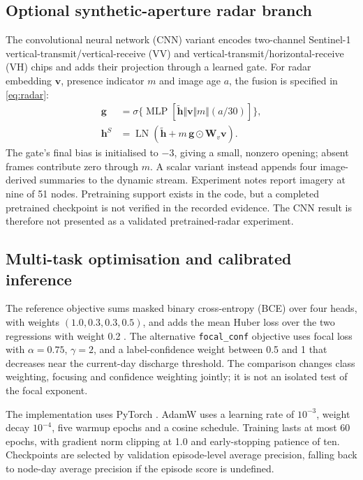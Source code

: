 \documentclass[conference]{IEEEtran}
\begin{document}
\subsection{Optional synthetic-aperture radar branch}
The convolutional neural network (CNN) variant encodes two-channel Sentinel-1
vertical-transmit/vertical-receive (VV) and vertical-transmit/horizontal-receive (VH)
chips and adds their
projection through a learned gate. For radar embedding $\mathbf{v}$,
presence indicator $m$ and image age $a$, the fusion is specified in
\eqref{eq:radar}:
\begin{align}
\mathbf{g}&=\sigma\{\operatorname{MLP}
 [\widetilde{\mathbf{h}}\Vert\mathbf{v}\Vert m\Vert(a/30)]\},\\
\mathbf{h}^{S}&=\operatorname{LN}
 (\widetilde{\mathbf{h}}+m\,\mathbf{g}\odot\mathbf{W}_v\mathbf{v}).
\label{eq:radar}
\end{align}
The gate's final bias is initialised to $-3$, giving a small, nonzero opening;
absent frames contribute zero through $m$. A scalar variant instead appends
four image-derived summaries to the dynamic stream. Experiment notes report
imagery at nine of 51 nodes. Pretraining support exists in the code, but a
completed pretrained checkpoint is not verified in the recorded evidence.
The CNN result is therefore not presented as a validated pretrained-radar
experiment.

\subsection{Multi-task optimisation and calibrated inference}
The reference objective sums masked binary cross-entropy (BCE) over four heads,
with weights $(1.0,0.3,0.3,0.5)$, and adds the mean Huber loss over the two
regressions with weight 0.2 \cite{huber1964}. The alternative \texttt{focal\_conf} objective
uses focal loss with $\alpha=0.75$, $\gamma=2$, and a label-confidence weight
between 0.5 and 1 that decreases near the current-day discharge threshold.
The comparison changes class weighting, focusing and confidence weighting
jointly; it is not an isolated test of the focal exponent.

The implementation uses PyTorch \cite{paszke2019}. AdamW \cite{loshchilov2019}
uses a learning rate of $10^{-3}$, weight decay $10^{-4}$, five warmup
epochs and a cosine schedule. Training lasts at most 60 epochs, with gradient
norm clipping at 1.0 and early-stopping patience of ten. Checkpoints are selected
by validation episode-level average precision, falling back to node-day average
precision if the episode score is undefined.
\end{document}
